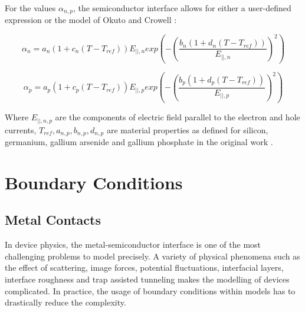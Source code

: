 For the values $\alpha_{n,p}$, the semiconductor interface allows for either a user-defined expression or the model of Okuto and Crowell \cite{okuto:1975}:

\begin{equation}
	\alpha_{n}=a_{n}\left(1+c_{n}\left(T-T_{ref}\right)\right)E_{||,n}exp\left(-\left(\frac{b_{n}\left(1+d_{n}\left(T-T_{ref}\right)\right)}{E_{||,n}}\right)^{2}\right)
\end{equation}

\begin{equation}
	\alpha_{p}=a_{p}\left(1+c_{p}\left(T-T_{ref}\right)\right)E_{||,p}exp\left(-\left(\frac{b_{p}\left(1+d_{p}\left(T-T_{ref}\right)\right)}{E_{||,p}}\right)^{2}\right)
\end{equation}

Where $E_{||,n,p}$ are the components of electric field parallel to the electron and hole currents, $T_{ref}, a_{n,p}, b_{n,p}, d_{n,p}$ are material properties as defined for silicon, germanium, gallium arsenide and gallium phosphate in the original work \cite{okuto:1975}.

\section{Boundary Conditions}
\subsection{Metal Contacts}
In device physics, the metal-semiconductor interface is one of the most challenging problems to model precisely. A variety of physical phenomena such as the effect of scattering, image forces, potential fluctuations, interfacial layers, interface roughness and trap assisted tunneling makes the modelling of devices complicated. In practice, the usage of boundary conditions within models has to drastically reduce the complexity.
